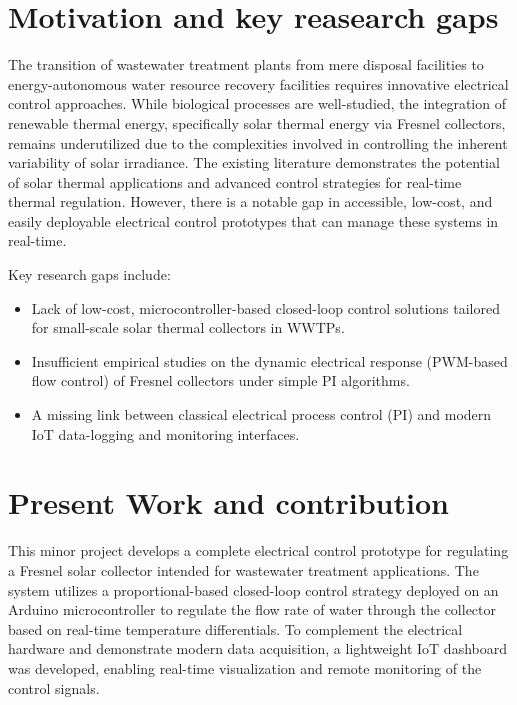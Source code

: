 \documentclass[12pt,a4paper]{report}
\begin{document}
\section{Motivation and key reasearch gaps}
The transition of wastewater treatment plants from mere disposal facilities to energy-autonomous water resource recovery facilities requires innovative electrical control approaches. While biological processes are well-studied, the integration of renewable thermal energy, specifically solar thermal energy via Fresnel collectors, remains underutilized due to the complexities involved in controlling the inherent variability of solar irradiance. The existing literature demonstrates the potential of solar thermal applications and advanced control strategies for real-time thermal regulation. However, there is a notable gap in accessible, low-cost, and easily deployable electrical control prototypes that can manage these systems in real-time. 

Key research gaps include:
\begin{itemize}
    \item Lack of low-cost, microcontroller-based closed-loop control solutions tailored for small-scale solar thermal collectors in WWTPs.
    \item Insufficient empirical studies on the dynamic electrical response (PWM-based flow control) of Fresnel collectors under simple PI algorithms.
    \item A missing link between classical electrical process control (PI) and modern IoT data-logging and monitoring interfaces.
\end{itemize}

\section{Present Work and contribution}
This minor project develops a complete electrical control prototype for regulating a Fresnel solar collector intended for wastewater treatment applications. The system utilizes a proportional-based closed-loop control strategy deployed on an Arduino microcontroller to regulate the flow rate of water through the collector based on real-time temperature differentials. To complement the electrical hardware and demonstrate modern data acquisition, a lightweight IoT dashboard was developed, enabling real-time visualization and remote monitoring of the control signals. 
\end{document}
